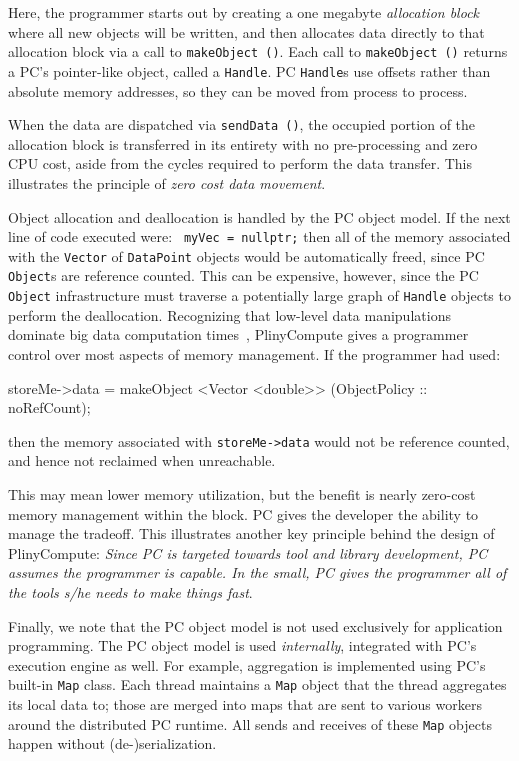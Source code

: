 \noindent
Here, the programmer starts out by creating a one megabyte \emph{allocation block} where all new objects will be written,
and then allocates data directly to that allocation block via a call to \texttt{makeObject ()}.  Each call to  \texttt{makeObject ()}
returns a PC's pointer-like object, called a \texttt{Handle}.  PC \texttt{Handle}s use offsets rather than absolute memory
addresses, so they can be moved from process to process.  

When the data are dispatched via \texttt{sendData ()},
the occupied
portion of the allocation block is transferred in its entirety with
no pre-processing and zero CPU cost, aside from the cycles required to perform the data transfer.  
This illustrates the principle of \emph{zero cost data movement}.

Object allocation and deallocation 
is handled by the PC object model.
If the next line of code executed were:
\texttt{
myVec = nullptr;}
then all of the memory associated with the \texttt{Vector} of \texttt{DataPoint} objects would be automatically
freed, since PC \texttt{Object}s are reference counted.  This can
be expensive, however, since the PC \texttt{Object} infrastructure must traverse a potentially large graph of \texttt{Handle} objects to perform the deallocation.  
Recognizing that low-level data manipulations dominate big data
computation times~\cite{ousterhout2015making, shi2015clash}, PlinyCompute gives a programmer control
over most aspects of memory management. If the 
programmer had used: 

\begin{codesmall}
storeMe->data = makeObject <Vector <double>>
     (ObjectPolicy :: noRefCount);
\end{codesmall}


\noindent then the memory associated with \texttt{storeMe->data} would
not be reference counted, and hence not reclaimed when unreachable.  

This may mean lower memory utilization,
but the benefit is nearly zero-cost memory management within the block.
PC gives the developer the ability to manage the tradeoff.
This illustrates another key principle behind the design of
PlinyCompute: \emph{Since PC is targeted towards tool and library
  development, PC assumes the programmer is capable.  In
  the small, PC gives the programmer all of the tools s/he needs to make things fast}.

Finally, we note that the PC object model is not used exclusively 
for application programming.  The PC object model
is used \emph{internally}, integrated with PC's execution engine as well.
For example, aggregation is implemented using PC's built-in
\texttt{Map} class.  Each thread maintains
a \texttt{Map} object that the thread aggregates its local data to; those are
merged into maps that are sent to various workers around the
distributed PC
runtime.  All sends and receives of these \texttt{Map} objects happen
without (de-)serialization.


